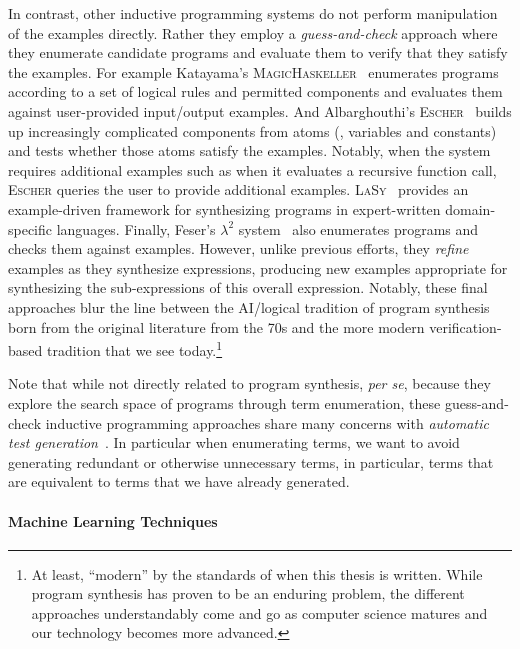 In contrast, other inductive programming systems do not perform manipulation of the examples directly.
Rather they employ a \emph{guess-and-check} approach where they enumerate candidate programs and evaluate them to verify that they satisfy the examples.
For example Katayama's \textsc{MagicHaskeller}~\citep{katayama-pepm-2012} enumerates programs according to a set of
logical rules and permitted components and evaluates them against user-provided input/output examples.
And Albarghouthi's \textsc{Escher}~\citep{albarghouthi-cav-2013} builds up increasingly complicated components from atoms (\ie, variables and constants) and tests whether those atoms satisfy the examples.
Notably, when the system requires additional examples such as when it evaluates a recursive function call, \textsc{Escher} queries the user to provide additional examples.
\textsc{LaSy}~\citep{perelman-pldi-2014} provides an example-driven framework for synthesizing programs in expert-written domain-specific languages.
Finally, Feser's $λ^2$ system~\citep{feser-pldi-2015} also enumerates programs and checks them against examples.
However, unlike previous efforts, they \emph{refine} examples as they synthesize expressions, producing new examples appropriate for synthesizing the sub-expressions of this overall expression.
Notably, these final approaches blur the line between the AI/logical tradition of program synthesis born from the original literature from the 70s and the more modern verification-based tradition that we see today.\footnote{%
  At least, ``modern'' by the standards of when this thesis is written.
  While program synthesis has proven to be an enduring problem, the different approaches understandably come and go as computer science matures and our technology becomes more advanced.
}

Note that while not directly related to program synthesis, \emph{per se}, because they explore the search space of programs through term enumeration, these guess-and-check inductive programming approaches share many concerns with \emph{automatic test generation}~\citep{claessen-flp-2014, grygiel-jfp-2013, yakushev-aaip-2010}.
In particular when enumerating terms, we want to avoid generating redundant or otherwise unnecessary terms, in particular, terms that are equivalent to terms that we have already generated.

\paragraph{Machine Learning Techniques}

